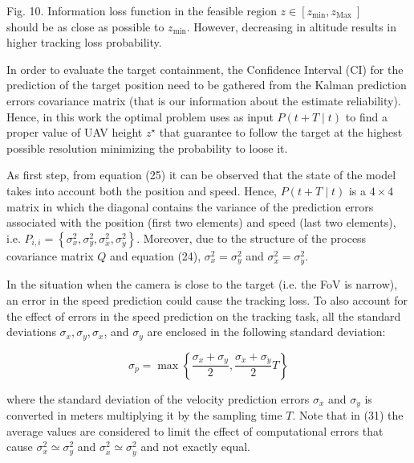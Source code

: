 \documentclass[conference]{IEEEtran}
\begin{document}
Fig. 10. Information loss function in the feasible region $z \in\left[z_{\min }, z_{\text {Max }}\right]$\\
should be as close as possible to $z_{\min }$. However, decreasing in altitude results in higher tracking loss probability.

In order to evaluate the target containment, the Confidence Interval (CI) for the prediction of the target position need to be gathered from the Kalman prediction errors covariance matrix (that is our information about the estimate reliability). Hence, in this work the optimal problem uses as input $P(t+T \mid t)$ to find a proper value of UAV height $z^{\star}$ that guarantee to follow the target at the highest possible resolution minimizing the probability to loose it.

As first step, from equation (25) it can be observed that the state of the model takes into account both the position and speed. Hence, $P(t+T \mid t)$ is a $4 \times 4$ matrix in which the diagonal contains the variance of the prediction errors associated with the position (first two elements) and speed (last two elements), i.e. $P_{i, i}=\left\{\sigma_{x}^{2}, \sigma_{y}^{2}, \sigma_{\dot{x}}^{2}, \sigma_{\dot{y}}^{2}\right\}$. Moreover, due to the structure of the process covariance matrix $Q$ and equation (24), $\sigma_{x}^{2}=\sigma_{y}^{2}$ and $\sigma_{\dot{x}}^{2}=\sigma_{\dot{y}}^{2}$.

In the situation when the camera is close to the target (i.e. the FoV is narrow), an error in the speed prediction could cause the tracking loss. To also account for the effect of errors in the speed prediction on the tracking task, all the standard deviations $\sigma_{x}, \sigma_{y}, \sigma_{\dot{x}}$, and $\sigma_{\dot{y}}$ are enclosed in the following standard deviation:


\begin{equation*}
\sigma_{p}=\max \left\{\frac{\sigma_{x}+\sigma_{y}}{2}, \frac{\sigma_{\dot{x}}+\sigma_{\dot{y}}}{2} T\right\} \tag{31}
\end{equation*}


where the standard deviation of the velocity prediction errors $\sigma_{\dot{x}}$ and $\sigma_{\dot{y}}$ is converted in meters multiplying it by the sampling time $T$. Note that in (31) the average values are considered to limit the effect of computational errors that cause $\sigma_{x}^{2} \simeq \sigma_{y}^{2}$ and $\sigma_{\dot{x}}^{2} \simeq \sigma_{\dot{y}}^{2}$ and not exactly equal.
\end{document}
